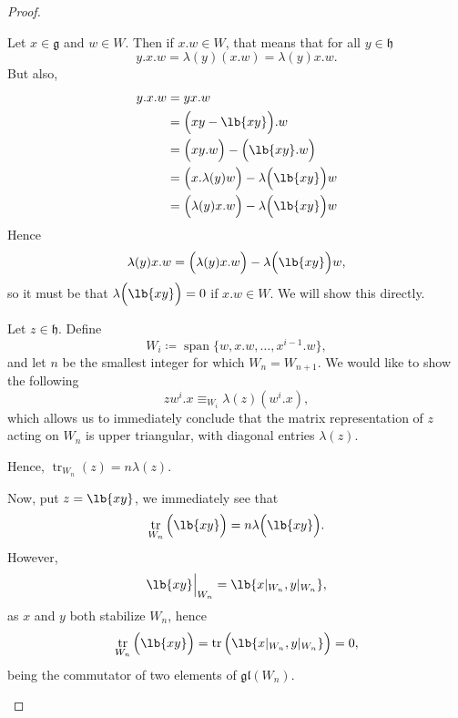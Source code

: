 \documentclass{article}
\DeclarePairedDelimiter\lb\lbrack\rbrack
\DeclareMathOperator{\tr}{tr}
\DeclareMathOperator{\opspan}{span}
\newcommand*\frkg{{\ensuremath{\mathfrak{g}}}}
\newcommand*\frkh{{\ensuremath{\mathfrak{h}}}}
\newcommand*\glalg{\ensuremath{\mathfrak{gl}}}
\newcommand*\acts{.}
\begin{document}
\begin{proof}
\begin{itemize}
            Let $x \in \frkg$ and $w \in W$.
            Then if $x \acts w \in W$, that means that for all $y \in \frkh$
            \[
                y \acts x \acts w
                =
                \lambda(y)(x \acts w)
                =
                \lambda(y)x \acts w.
            \]
            But also,
            \begin{align*}
                y \acts x \acts w
                &=
                yx \acts w
                \\
                &=
                \Big(xy - \lb{xy}\Big) \acts w
                \\
                &=
                \Big(
                    xy \acts w
                \Big)
                -
                \Big(
                    \lb{xy} \acts w
                \Big)
                \\
                &=
                \Big(
                    x \acts \lambda(y)w
                \Big)
                -
                \lambda\Big(\lb{xy}\Big) w
                \\
                &=
                \Big(
                    \lambda(y)x \acts w
                \Big)
                -
                \lambda\Big(\lb{xy}\Big) w
            \end{align*}
            Hence
            \[
                \lambda(y)x \acts w
                =
                \Big(
                    \lambda(y)x \acts w
                \Big)
                - \lambda\Big(\lb{xy}\Big) w
                ,
            \]
            so it must be that $\lambda\Big(\lb{xy}\Big) = 0$ if $x \acts w \in W$.
            We will show this directly.

            Let $z \in \frkh$.
            Define
            \[
                W_i
                \coloneq
                \opspan\{w, x \acts w, \ldots, x^{i-1} \acts w\},
            \]
            and let $n$ be the smallest integer for which $W_n = W_{n+1}$.
            We would like to show the following
            \[
                zw^i \acts x
                \equiv_{W_i}
                \lambda(z)(w^i \acts x),
            \]
            which allows us to immediately conclude that the matrix representation of $z$ acting on $W_n$ is upper triangular, with diagonal entries $\lambda(z)$.

            Hence, $\tr_{W_n}(z) = n\lambda(z)$.

            Now, put $z = \lb{xy}$, we immediately see that
            \[
                \tr_{W_n}\Big(\lb{xy}\Big)
                =
                n\lambda\Big(\lb{xy}\Big).
            \]
            However,
            \[
                \lb{xy}\Big\rvert_{W_n}
                =
                \lb{
                    x \rvert_{W_n},
                    y \rvert_{W_n}
                },
            \]
            as $x$ and $y$ both stabilize $W_n$, hence
            \[
                \tr_{W_n}\Big(\lb{xy}\Big)
                =
                \tr\Big(\lb{
                    x \rvert_{W_n},
                    y \rvert_{W_n}
                }\Big)
                =
                0,
            \]
            being the commutator of two elements of $\glalg(W_n)$.


\end{itemize}
\end{proof}
\end{document}
